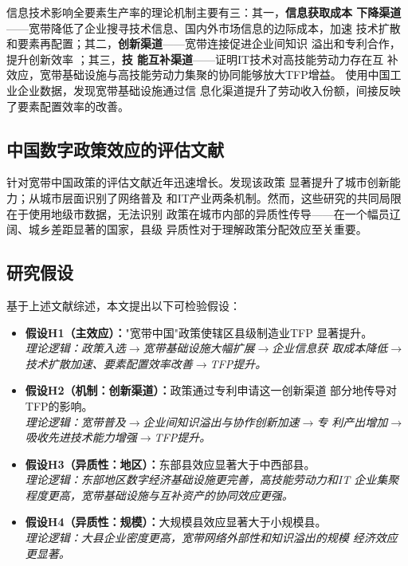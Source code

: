 \documentclass[12pt, a4paper]{article}
\begin{document}
信息技术影响全要素生产率的理论机制主要有三：其一，\textbf{信息获取成本
下降渠道}——宽带降低了企业搜寻技术信息、国内外市场信息的边际成本，加速
技术扩散和要素再配置；其二，\textbf{创新渠道}——宽带连接促进企业间知识
溢出和专利合作，提升创新效率 \citep{cui2022broadband}；其三，\textbf{技
能互补渠道}——\citet{acemoglu2011skills}证明IT技术对高技能劳动力存在互
补效应，宽带基础设施与高技能劳动力集聚的协同能够放大TFP增益。
\citet{liang2024broadband}使用中国工业企业数据，发现宽带基础设施通过信
息化渠道提升了劳动收入份额，间接反映了要素配置效率的改善。

\subsection{中国数字政策效应的评估文献}

针对宽带中国政策的评估文献近年迅速增长。\citet{zhao2024city}发现该政策
显著提升了城市创新能力；\citet{tan2022digital}从城市层面识别了网络普及
和IT产业两条机制。然而，这些研究的共同局限在于使用地级市数据，无法识别
政策在城市内部的异质性传导——在一个幅员辽阔、城乡差距显著的国家，县级
异质性对于理解政策分配效应至关重要。

\subsection{研究假设}

基于上述文献综述，本文提出以下可检验假设：

\begin{itemize}[leftmargin=2em]
  \item \textbf{假设H1（主效应）：}"宽带中国"政策使辖区县级制造业TFP
    显著提升。\\
    \textit{理论逻辑：政策入选$\to$宽带基础设施大幅扩展$\to$企业信息获
    取成本降低$\to$技术扩散加速、要素配置效率改善$\to$TFP提升。}

  \item \textbf{假设H2（机制：创新渠道）：}政策通过专利申请这一创新渠道
    部分地传导对TFP的影响。\\
    \textit{理论逻辑：宽带普及$\to$企业间知识溢出与协作创新加速$\to$专
    利产出增加$\to$吸收先进技术能力增强$\to$TFP提升。}

  \item \textbf{假设H3（异质性：地区）：}东部县效应显著大于中西部县。\\
    \textit{理论逻辑：东部地区数字经济基础设施更完善，高技能劳动力和IT
    企业集聚程度更高，宽带基础设施与互补资产的协同效应更强。}

  \item \textbf{假设H4（异质性：规模）：}大规模县效应显著大于小规模县。\\
    \textit{理论逻辑：大县企业密度更高，宽带网络外部性和知识溢出的规模
    经济效应更显著。}
\end{itemize}
\end{document}
